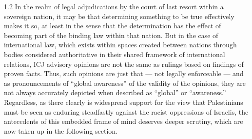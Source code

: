 \documentclass[../unravbook.tex]{subfiles}
\begin{document}
\begin{spacing}{1.2}
In the realm of legal adjudications by the court of last resort within a sovereign nation, it may be that determining something to be true effectively makes it so, at least in the sense that the determination has the effect of becoming part of the binding law within that nation. But in the case of international law, which exists within spaces created between nations through bodies considered authoritative in their shared framework of international relations, ICJ advisory opinions are not the same as rulings based on findings of proven facts. Thus, such opinions are just that --- not legally enforceable --- and as pronouncements of ``global awareness'' of the validity of the opinions, they are not always accurately depicted when described as ``global'' or ``awareness.'' Regardless, as there clearly is widespread support for the view that Palestinians must be seen as enduring steadfastly against the racist oppressions of Israelis, the antecedents of this embedded frame of mind deserves deeper scrutiny, which are now taken up in the following section. 
\parindent 0pt
\parskip 6pt

\end{spacing}
{\footnotesize
\printendnotes[paragraph]}

\thispagestyle{empty} %
\end{document}
